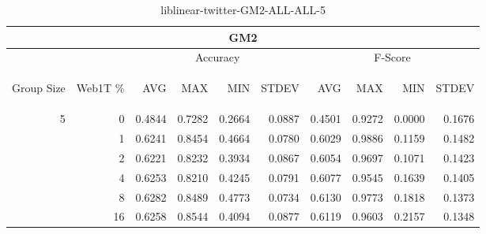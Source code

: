 \begin{center}
\begin{table}[htbp]
\begin{tabular}{ | r | r | r | r | r | r | r | r | r | r |}
\hline
\multicolumn{10}{|c|}{GM2}\\
\hline
 & & \multicolumn{4}{|c|}{Accuracy} & \multicolumn{4}{|c|}{F-Score}\\ \cline{3-10}
\begin{sideways}Group Size\end{sideways} & \begin{sideways}Web1T \%\end{sideways} & \begin{sideways}AVG\end{sideways} & \begin{sideways}MAX\end{sideways} & \begin{sideways}MIN\end{sideways} & \begin{sideways}STDEV\end{sideways} & \begin{sideways}AVG\end{sideways} & \begin{sideways}MAX\end{sideways} & \begin{sideways}MIN\end{sideways} & \begin{sideways}STDEV\end{sideways}\\
\hline
\multirow{6}{*}{5}
 & 0 & 0.4844 & 0.7282 & 0.2664 & 0.0887 & 0.4501 & 0.9272 & 0.0000 & 0.1676\\ \cline{2-10}
 & 1 & 0.6241 & 0.8454 & 0.4664 & 0.0780 & 0.6029 & 0.9886 & 0.1159 & 0.1482\\ \cline{2-10}
 & 2 & 0.6221 & 0.8232 & 0.3934 & 0.0867 & 0.6054 & 0.9697 & 0.1071 & 0.1423\\ \cline{2-10}
 & 4 & 0.6253 & 0.8210 & 0.4245 & 0.0791 & 0.6077 & 0.9545 & 0.1639 & 0.1405\\ \cline{2-10}
 & 8 & 0.6282 & 0.8489 & 0.4773 & 0.0734 & 0.6130 & 0.9773 & 0.1818 & 0.1373\\ \cline{2-10}
 & 16 & 0.6258 & 0.8544 & 0.4094 & 0.0877 & 0.6119 & 0.9603 & 0.2157 & 0.1348\\ \cline{2-10}
\hline
\end{tabular}
\caption{liblinear-twitter-GM2-ALL-ALL-5}
\end{table}
\end{center}

